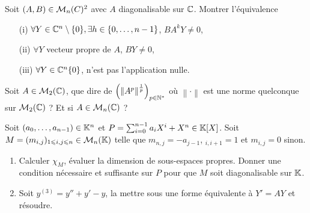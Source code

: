 \documentclass[12pt]{article}
\begin{document}
\begin{exercise}
	Soit $(A,B)\in\mathcal{M}_{n}(C)^{2}$ avec $A$ diagonalisable sur $\mathbb{C}$. Montrer l'équivalence
	\begin{enumerate}
		\item [(i)] $\forall Y\in\mathbb{C}^{n}\setminus\{0\},\exists h\in\{0,\dots,n-1\}$, $BA^{k}Y\neq0$,
		\item [(ii)] $\forall Y$ vecteur propre de $A$, $BY\neq0$,
		\item [(iii)] $\forall Y\in\mathbb{C}^{n}\{0\}$,  n'est pas l'application nulle.
	\end{enumerate}
\end{exercise}

\begin{exercise}
	Soit $A\in\mathcal{M}_{2}(\mathbb{C})$, que dire de $\left(\left\lVert A^{p}\right\rVert^\frac{1}{p}\right)_{p\in\mathbb{N}^{*}}$ où $\left\lVert\cdot\right\rVert$ est une norme quelconque sur $\mathcal{M}_{2}(\mathbb{C})$ ? Et si $A\in\mathcal{M}_{n}(\mathbb{C})$ ?
\end{exercise}

\begin{exercise}
	Soit $(a_0,\dots,a_{n-1})\in\mathbb{K}^{n}$ et $P=\sum_{i=0}^{n-1}a_{i}X^{i}+X^{n}\in\mathbb{K}[X]$. Soit $M=(m_{i,j})_{1\leqslant i,j\leqslant n}\in\mathcal{M}_n(\mathbb{K})$ telle que $m_{n,j}=-a_{j-1}$, $_{i,i+1}=1$ et $m_{i,j}=0$ sinon.
	\begin{enumerate}
		\item Calculer $\chi_{M}$, évaluer la dimension de sous-espaces propres. Donner une condition nécessaire et suffisante sur $P$ pour que $M$ soit diagonalisable sur $\mathbb{K}$.
		\item Soit $y^{(3)}=y''+y'-y$, la mettre sous une forme équivalente à $Y'=AY$ et résoudre.
	\end{enumerate}
\end{exercise}
\end{document}
